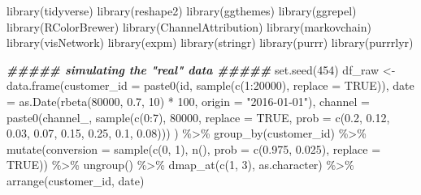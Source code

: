 \documentclass[
]{book}
\newenvironment{Shaded}{\begin{snugshade}}{\end{snugshade}}
\newcommand{\AttributeTok}[1]{\textcolor[rgb]{0.77,0.63,0.00}{#1}}
\newcommand{\ConstantTok}[1]{\textcolor[rgb]{0.00,0.00,0.00}{#1}}
\newcommand{\DecValTok}[1]{\textcolor[rgb]{0.00,0.00,0.81}{#1}}
\newcommand{\DocumentationTok}[1]{\textcolor[rgb]{0.56,0.35,0.01}{\textbf{\textit{#1}}}}
\newcommand{\FloatTok}[1]{\textcolor[rgb]{0.00,0.00,0.81}{#1}}
\newcommand{\FunctionTok}[1]{\textcolor[rgb]{0.00,0.00,0.00}{#1}}
\newcommand{\NormalTok}[1]{#1}
\newcommand{\OtherTok}[1]{\textcolor[rgb]{0.56,0.35,0.01}{#1}}
\newcommand{\SpecialCharTok}[1]{\textcolor[rgb]{0.00,0.00,0.00}{#1}}
\newcommand{\StringTok}[1]{\textcolor[rgb]{0.31,0.60,0.02}{#1}}
\begin{document}
\begin{Shaded}
\begin{Highlighting}[]
\FunctionTok{library}\NormalTok{(tidyverse)}
\FunctionTok{library}\NormalTok{(reshape2)}
\FunctionTok{library}\NormalTok{(ggthemes)}
\FunctionTok{library}\NormalTok{(ggrepel)}
\FunctionTok{library}\NormalTok{(RColorBrewer)}
\FunctionTok{library}\NormalTok{(ChannelAttribution)}
\FunctionTok{library}\NormalTok{(markovchain)}
\FunctionTok{library}\NormalTok{(visNetwork)}
\FunctionTok{library}\NormalTok{(expm)}
\FunctionTok{library}\NormalTok{(stringr)}
\FunctionTok{library}\NormalTok{(purrr)}
\FunctionTok{library}\NormalTok{(purrrlyr)}
 
 
\DocumentationTok{\#\#\#\#\# simulating the "real" data \#\#\#\#\#}
\FunctionTok{set.seed}\NormalTok{(}\DecValTok{454}\NormalTok{)}
\NormalTok{df\_raw }\OtherTok{\textless{}{-}} \FunctionTok{data.frame}\NormalTok{(}\AttributeTok{customer\_id =} \FunctionTok{paste0}\NormalTok{(}\StringTok{\textquotesingle{}id\textquotesingle{}}\NormalTok{, }\FunctionTok{sample}\NormalTok{(}\FunctionTok{c}\NormalTok{(}\DecValTok{1}\SpecialCharTok{:}\DecValTok{20000}\NormalTok{), }\AttributeTok{replace =} \ConstantTok{TRUE}\NormalTok{)), }\AttributeTok{date =} \FunctionTok{as.Date}\NormalTok{(}\FunctionTok{rbeta}\NormalTok{(}\DecValTok{80000}\NormalTok{, }\FloatTok{0.7}\NormalTok{, }\DecValTok{10}\NormalTok{) }\SpecialCharTok{*} \DecValTok{100}\NormalTok{, }\AttributeTok{origin =} \StringTok{"2016{-}01{-}01"}\NormalTok{), }\AttributeTok{channel =} \FunctionTok{paste0}\NormalTok{(}\StringTok{\textquotesingle{}channel\_\textquotesingle{}}\NormalTok{, }\FunctionTok{sample}\NormalTok{(}\FunctionTok{c}\NormalTok{(}\DecValTok{0}\SpecialCharTok{:}\DecValTok{7}\NormalTok{), }\DecValTok{80000}\NormalTok{, }\AttributeTok{replace =} \ConstantTok{TRUE}\NormalTok{, }\AttributeTok{prob =} \FunctionTok{c}\NormalTok{(}\FloatTok{0.2}\NormalTok{, }\FloatTok{0.12}\NormalTok{, }\FloatTok{0.03}\NormalTok{, }\FloatTok{0.07}\NormalTok{, }\FloatTok{0.15}\NormalTok{, }\FloatTok{0.25}\NormalTok{, }\FloatTok{0.1}\NormalTok{, }\FloatTok{0.08}\NormalTok{))) ) }\SpecialCharTok{\%\textgreater{}\%}
        \FunctionTok{group\_by}\NormalTok{(customer\_id) }\SpecialCharTok{\%\textgreater{}\%}
        \FunctionTok{mutate}\NormalTok{(}\AttributeTok{conversion =} \FunctionTok{sample}\NormalTok{(}\FunctionTok{c}\NormalTok{(}\DecValTok{0}\NormalTok{, }\DecValTok{1}\NormalTok{), }\FunctionTok{n}\NormalTok{(), }\AttributeTok{prob =} \FunctionTok{c}\NormalTok{(}\FloatTok{0.975}\NormalTok{, }\FloatTok{0.025}\NormalTok{), }\AttributeTok{replace =} \ConstantTok{TRUE}\NormalTok{)) }\SpecialCharTok{\%\textgreater{}\%}
        \FunctionTok{ungroup}\NormalTok{() }\SpecialCharTok{\%\textgreater{}\%}
        \FunctionTok{dmap\_at}\NormalTok{(}\FunctionTok{c}\NormalTok{(}\DecValTok{1}\NormalTok{, }\DecValTok{3}\NormalTok{), as.character) }\SpecialCharTok{\%\textgreater{}\%}
        \FunctionTok{arrange}\NormalTok{(customer\_id, date)}
 

\end{Highlighting}
\end{Shaded}
\end{document}
